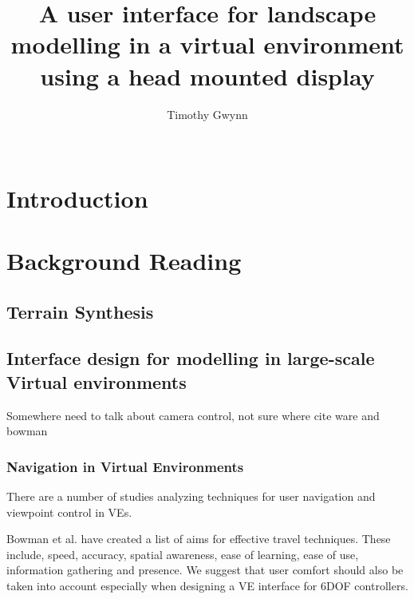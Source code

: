 \documentclass{sig-alternate-05-2015}
\begin{document}
\title{A user interface for landscape modelling in a virtual environment using a head mounted display}

\author{
\alignauthor
Timothy Gwynn\\
       \\
}
\maketitle
\begin{CCSXML}

\end{CCSXML}



\printccsdesc
{}
\begin{abstract}
	
\end{abstract}
\section{Introduction}
\section{Background Reading}
\subsection{Terrain Synthesis}
\subsection{Interface design for modelling in large-scale Virtual environments}
Somewhere need to talk about camera control, not sure where cite ware and bowman
\subsubsection{Navigation in Virtual Environments}
There are a number of studies analyzing techniques for user navigation and viewpoint control in VEs.

Bowman et al. have created a list of aims for effective travel techniques.\cite{Bowman1997} These include, speed, accuracy, spatial awareness, ease of learning, ease of use, information gathering and presence. We suggest that user comfort should also be taken into account especially when designing a VE interface for 6DOF controllers.
\end{document}
